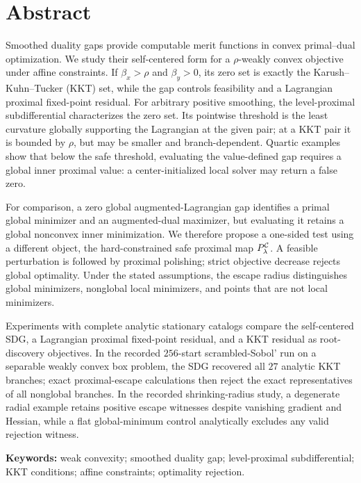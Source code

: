\section*{Abstract}

Smoothed duality gaps provide computable merit functions in convex primal--dual
optimization.  We study their self-centered form for a
\(\rho\)-weakly convex objective under affine constraints.  If
\(\beta_x>\rho\) and \(\beta_y>0\), its zero set is exactly the
Karush--Kuhn--Tucker (KKT) set, while the gap controls feasibility and a
Lagrangian proximal fixed-point residual.  For arbitrary positive smoothing, the
level-proximal subdifferential characterizes the zero set.  Its pointwise
threshold is the least curvature globally supporting the Lagrangian at the
given pair; at a KKT pair it is bounded by \(\rho\), but may be smaller and
branch-dependent.  Quartic examples show that below the safe threshold,
evaluating the value-defined gap requires a global inner proximal value: a
center-initialized local solver may return a false zero.

For comparison, a zero global augmented-Lagrangian gap identifies a primal
global minimizer and an augmented-dual maximizer, but evaluating it retains a
global nonconvex inner minimization.  We therefore propose a one-sided test
using a different object, the hard-constrained safe proximal map
\(P_\lambda^{\mathcal{C}}\).  A feasible perturbation is followed by proximal
polishing; strict objective decrease rejects global optimality.  Under the
stated assumptions, the escape radius distinguishes global minimizers,
nonglobal local minimizers, and points that are not local minimizers.

Experiments with complete analytic stationary catalogs compare the
self-centered SDG, a Lagrangian proximal fixed-point residual, and a KKT
residual as root-discovery objectives.  In the recorded \(256\)-start
scrambled-Sobol' run on a separable weakly convex box problem, the SDG
recovered all \(27\) analytic KKT branches; exact proximal-escape calculations
then reject the exact representatives of all nonglobal branches.
In the recorded shrinking-radius study,
a degenerate radial example retains positive escape witnesses despite
vanishing gradient and Hessian, while a flat global-minimum control
analytically excludes any valid rejection witness.

\vspace{0.7em}
\noindent\textbf{Keywords:} weak convexity; smoothed duality gap;
level-proximal subdifferential; KKT conditions; affine constraints;
optimality rejection.
